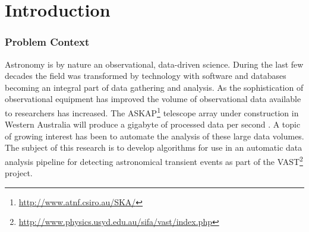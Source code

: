 \chapter{Introduction}

\subsection{Problem Context}
	Astronomy is by nature an observational, data-driven science. During the last few decades the field was transformed by technology with software and databases becoming an integral part of data gathering and analysis. As the sophistication of observational equipment has improved the volume of observational data available to researchers has increased. The ASKAP\footnote{\url{http://www.atnf.csiro.au/SKA/}} telescope array under construction in Western Australia will produce a gigabyte of processed data per second . A topic of growing interest has been to automate the analysis of these large data volumes. The subject of this research is to develop algorithms for use in an automatic data analysis pipeline for detecting astronomical transient events as part of the VAST\footnote{\url{http://www.physics.usyd.edu.au/sifa/vast/index.php}} project.
